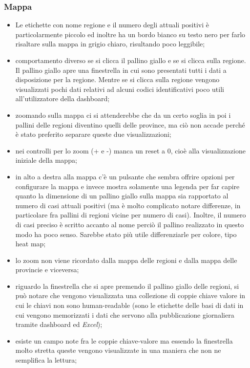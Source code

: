 \subsubsection{Mappa}
\label{sss:mappa}
\begin{itemize}
    \item Le etichette con nome regione e il numero degli attuali positivi è particolarmente piccolo ed inoltre ha un bordo bianco su testo nero per farlo risaltare sulla mappa in grigio chiaro, risultando poco leggibile;
    \item comportamento diverso se si clicca il pallino giallo e se si clicca sulla regione. Il pallino giallo apre una finestrella in cui sono presentati tutti i dati a disposizione per la regione. Mentre se si clicca sulla regione vengono visualizzati pochi dati relativi ad alcuni codici identificativi poco utili all'utilizzatore della dashboard;
    \item zoomando sulla mappa ci si attenderebbe che da un certo soglia in poi i pallini delle regioni diventino quelli delle province, ma ciò non accade perché è stato preferito separare queste due visualizzazioni;
    \item nei controlli per lo zoom (+ e -) manca un reset a 0, cioè alla visualizzazione iniziale della mappa;
    \item in alto a destra alla mappa c'è un pulsante che sembra offrire opzioni per configurare la mappa e invece mostra solamente una legenda per far capire quanto la dimensione di un pallino giallo sulla mappa sia rapportato al numero di casi attuali positivi (ma è molto complicato notare differenze, in particolare fra pallini di regioni vicine per numero di casi). Inoltre, il numero di casi preciso è scritto accanto al nome perciò il pallino realizzato in questo modo ha poco senso. Sarebbe stato più utile differenziarle per colore, tipo heat map;
    \item lo zoom non viene ricordato dalla mappa delle regioni e dalla mappa delle provincie e viceversa;
    \item riguardo la finestrella che si apre premendo il pallino giallo delle regioni, si può notare che vengono visualizzata una collezione di coppie chiave valore in cui le chiavi non sono human-readable (sono le etichette delle basi di dati in cui vengono memorizzati i dati che servono alla pubblicazione giornaliera tramite dashboard ed \textit{Excel});
    \item esiste un campo note fra le coppie chiave-valore ma essendo la finestrella molto stretta queste vengono visualizzate in una maniera che non ne semplifica la lettura;

\end{itemize}
